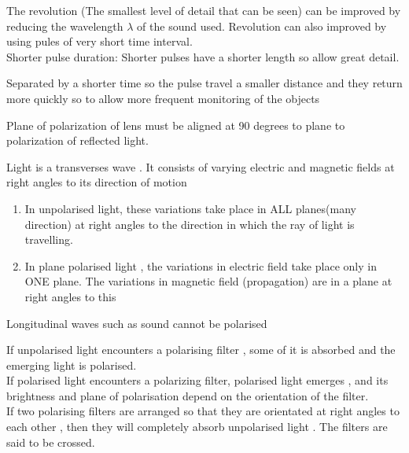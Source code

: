 \documentclass[a4paper]{article}
\begin{document}
\begin{defi}[revolution]
The revolution (The smallest level of detail that can be seen) can be improved by reducing the wavelength $\lambda$ of the sound used. Revolution can also improved by using pules of very short time interval.\\

Shorter pulse duration:
Shorter pulses have a shorter length so allow great detail.
\end{defi}

\begin{defi}
Separated by a shorter time so the pulse travel a smaller distance and they return more quickly so to allow more frequent monitoring of the objects
\end{defi}

\begin{defi}[Polarization]
Plane of polarization of lens must be aligned at 90 degrees to plane to polarization of reflected light.
\end{defi}


\begin{defi}[light]
Light is a transverses wave . It consists of varying electric and magnetic fields at right angles to its direction of motion
\begin{enumerate}
    \item In unpolarised light, these variations take place in ALL planes(many direction) at right angles to the direction in which the ray of light is travelling.
    \item In plane polarised light , the variations in electric field take place only in ONE plane. The variations in magnetic field (propagation) are in a plane at right angles to this
\end{enumerate}
Longitudinal waves such as sound cannot be polarised
\end{defi}

\begin{defi}
If unpolarised light encounters a polarising filter , some of it is absorbed and the emerging light is polarised.\\

If polarised light encounters a polarizing filter, polarised light emerges , and its brightness and plane of polarisation depend on the orientation of the filter.\\

If two polarising filters are arranged so that they are orientated at right angles to each other , then they will completely absorb unpolarised light . The filters are said to be crossed. 
\end{defi}
\end{document}
